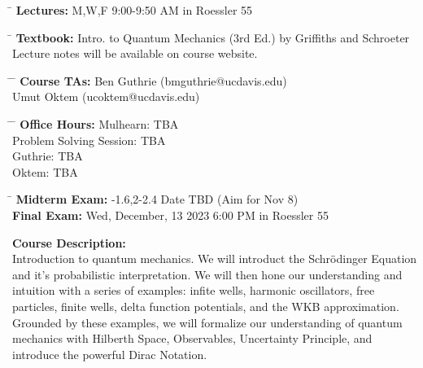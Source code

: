 \documentclass[12pt]{article}
\begin{document}
\noindent
\begin{tabbing}
\hspace*{8em} \= \kill 
\textbf {Lectures:} \> M,W,F 9:00-9:50 AM in Roessler 55 
\end{tabbing}
\noindent
\begin{tabbing}
\hspace*{8em} \= \kill 
\textbf{Textbook:} \> Intro. to Quantum Mechanics (3rd Ed.) by Griffiths and Schroeter \\
\> Lecture notes will be available on course website.
\end{tabbing}
\noindent
\begin{tabbing}
\hspace*{8em}\= \hspace*{8em} \= \kill 
\textbf{Course TAs:} \> Ben Guthrie \> (bmguthrie@ucdavis.edu) \\
                     \> Umut Oktem \> (ucoktem@ucdavis.edu) 
\end{tabbing}
\noindent
\begin{tabbing}
\hspace*{8em}\= \hspace*{12em} \= \kill 
\textbf{Office Hours:}    \> Mulhearn: \> TBA \\
    \> Problem Solving Session: \> TBA \\
    \> Guthrie: \> TBA \\
    \> Oktem: \> TBA \\
\end{tabbing}
\noindent
\begin{tabbing}
\hspace*{12em}\= \kill 
\textbf{Midterm Exam:} -1.6,2-2.4 Date TBD (Aim for Nov 8)\\
\textbf{Final Exam:} \> Wed, December, 13 2023 6:00 PM in Roessler 55
\end{tabbing}
\noindent
\textbf {Course Description:}\\
Introduction to quantum mechanics.  We will introduct the
Schr\"odinger Equation and it's probabilistic interpretation.  We will
then hone our understanding and intuition with a series of examples:
infite wells, harmonic oscillators, free particles, finite wells,
delta function potentials, and the WKB approximation.  Grounded by
these examples, we will formalize our understanding of quantum
mechanics with Hilberth Space, Observables, Uncertainty Principle, and
introduce the powerful Dirac Notation.\\ 

\newpage
\noindent
\end{document}
